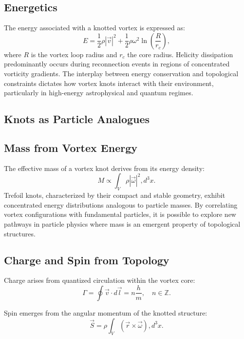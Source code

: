\subsection*{Energetics}


The energy associated with a knotted vortex is expressed as:
\begin{equation*}
E = \frac{1}{2} \rho |\vec{v}|^2 + \frac{1}{2} \rho \omega^2 \ln \left( \frac{R}{r_c} \right),
\end{equation*}
where $R$ is the vortex loop radius and $r_c$ the core radius. Helicity dissipation predominantly occurs during reconnection events in regions of concentrated vorticity gradients. The interplay between energy conservation and topological constraints dictates how vortex knots interact with their environment, particularly in high-energy astrophysical and quantum regimes.


\subsection*{Knots as Particle Analogues}


\subsection*{Mass from Vortex Energy}


The effective mass of a vortex knot derives from its energy density:
\begin{equation*}
M \propto \int_V \rho |\vec{\omega}|^2 , d^3x.
\end{equation*}
Trefoil knots, characterized by their compact and stable geometry, exhibit concentrated energy distributions analogous to particle masses. By correlating vortex configurations with fundamental particles, it is possible to explore new pathways in particle physics where mass is an emergent property of topological structures.


\subsection*{Charge and Spin from Topology}


Charge arises from quantized circulation within the vortex core:
\begin{equation*}
\Gamma = \oint \vec{v} \cdot d\vec{l} = n \frac{h}{m}, \quad n \in \mathbb{Z}.
\end{equation*}


Spin emerges from the angular momentum of the knotted structure:
\begin{equation*}
\vec{S} = \rho \int_V (\vec{r} \times \vec{\omega}) , d^3x.
\end{equation*}


